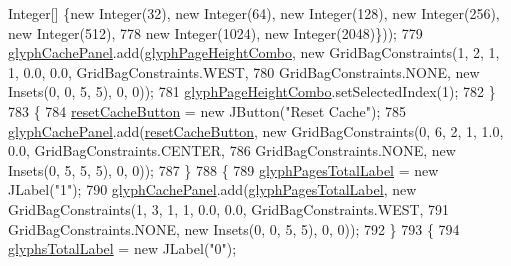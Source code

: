 \begin{DoxyCode}
      Integer[] \{\textcolor{keyword}{new} Integer(32), \textcolor{keyword}{new} Integer(64), \textcolor{keyword}{new} Integer(128), \textcolor{keyword}{new} Integer(256), \textcolor{keyword}{new} Integer(512),
778                             \textcolor{keyword}{new} Integer(1024), \textcolor{keyword}{new} Integer(2048)\}));
779                     \mbox{\hyperlink{classorg_1_1newdawn_1_1slick_1_1tools_1_1hiero_1_1_hiero_a2a248f40f119ae31da5353e42be42662}{glyphCachePanel}}.add(\mbox{\hyperlink{classorg_1_1newdawn_1_1slick_1_1tools_1_1hiero_1_1_hiero_af25be89f1cd46381e5e6fc93a02de118}{glyphPageHeightCombo}}, \textcolor{keyword}{new} 
      GridBagConstraints(1, 2, 1, 1, 0.0, 0.0, GridBagConstraints.WEST,
780                         GridBagConstraints.NONE, \textcolor{keyword}{new} Insets(0, 0, 5, 5), 0, 0));
781                     \mbox{\hyperlink{classorg_1_1newdawn_1_1slick_1_1tools_1_1hiero_1_1_hiero_af25be89f1cd46381e5e6fc93a02de118}{glyphPageHeightCombo}}.setSelectedIndex(1);
782                 \}
783                 \{
784                     \mbox{\hyperlink{classorg_1_1newdawn_1_1slick_1_1tools_1_1hiero_1_1_hiero_a82573cb24c97cc1e0abe7b5578da0e36}{resetCacheButton}} = \textcolor{keyword}{new} JButton(\textcolor{stringliteral}{"Reset Cache"});
785                     \mbox{\hyperlink{classorg_1_1newdawn_1_1slick_1_1tools_1_1hiero_1_1_hiero_a2a248f40f119ae31da5353e42be42662}{glyphCachePanel}}.add(\mbox{\hyperlink{classorg_1_1newdawn_1_1slick_1_1tools_1_1hiero_1_1_hiero_a82573cb24c97cc1e0abe7b5578da0e36}{resetCacheButton}}, \textcolor{keyword}{new} 
      GridBagConstraints(0, 6, 2, 1, 1.0, 0.0, GridBagConstraints.CENTER,
786                         GridBagConstraints.NONE, \textcolor{keyword}{new} Insets(0, 5, 5, 5), 0, 0));
787                 \}
788                 \{
789                     \mbox{\hyperlink{classorg_1_1newdawn_1_1slick_1_1tools_1_1hiero_1_1_hiero_a37a3bb42ae7db400e2f57afc462fe410}{glyphPagesTotalLabel}} = \textcolor{keyword}{new} JLabel(\textcolor{stringliteral}{"1"});
790                     \mbox{\hyperlink{classorg_1_1newdawn_1_1slick_1_1tools_1_1hiero_1_1_hiero_a2a248f40f119ae31da5353e42be42662}{glyphCachePanel}}.add(\mbox{\hyperlink{classorg_1_1newdawn_1_1slick_1_1tools_1_1hiero_1_1_hiero_a37a3bb42ae7db400e2f57afc462fe410}{glyphPagesTotalLabel}}, \textcolor{keyword}{new} 
      GridBagConstraints(1, 3, 1, 1, 0.0, 0.0, GridBagConstraints.WEST,
791                         GridBagConstraints.NONE, \textcolor{keyword}{new} Insets(0, 0, 5, 5), 0, 0));
792                 \}
793                 \{
794                     \mbox{\hyperlink{classorg_1_1newdawn_1_1slick_1_1tools_1_1hiero_1_1_hiero_a146359fd9b8ca84fe0282bf5958fc02e}{glyphsTotalLabel}} = \textcolor{keyword}{new} JLabel(\textcolor{stringliteral}{"0"});

\end{DoxyCode}
